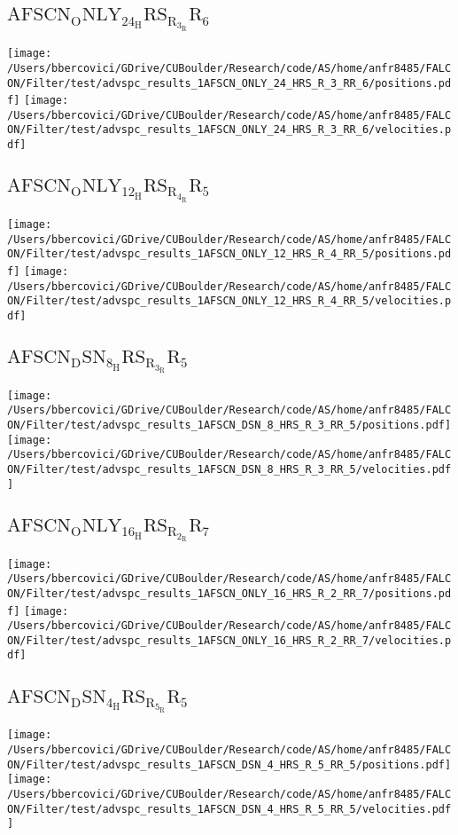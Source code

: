 \subsection{$\mathrm{AFSCN_ONLY_24_HRS_R_3_RR_6}$}
\texttt{[image: /Users/bbercovici/GDrive/CUBoulder/Research/code/AS/home/anfr8485/FALCON/Filter/test/advspc\_results\_1AFSCN\_ONLY\_24\_HRS\_R\_3\_RR\_6/positions.pdf]}
\texttt{[image: /Users/bbercovici/GDrive/CUBoulder/Research/code/AS/home/anfr8485/FALCON/Filter/test/advspc\_results\_1AFSCN\_ONLY\_24\_HRS\_R\_3\_RR\_6/velocities.pdf]}
\subsection{$\mathrm{AFSCN_ONLY_12_HRS_R_4_RR_5}$}
\texttt{[image: /Users/bbercovici/GDrive/CUBoulder/Research/code/AS/home/anfr8485/FALCON/Filter/test/advspc\_results\_1AFSCN\_ONLY\_12\_HRS\_R\_4\_RR\_5/positions.pdf]}
\texttt{[image: /Users/bbercovici/GDrive/CUBoulder/Research/code/AS/home/anfr8485/FALCON/Filter/test/advspc\_results\_1AFSCN\_ONLY\_12\_HRS\_R\_4\_RR\_5/velocities.pdf]}
\subsection{$\mathrm{AFSCN_DSN_8_HRS_R_3_RR_5}$}
\texttt{[image: /Users/bbercovici/GDrive/CUBoulder/Research/code/AS/home/anfr8485/FALCON/Filter/test/advspc\_results\_1AFSCN\_DSN\_8\_HRS\_R\_3\_RR\_5/positions.pdf]}
\texttt{[image: /Users/bbercovici/GDrive/CUBoulder/Research/code/AS/home/anfr8485/FALCON/Filter/test/advspc\_results\_1AFSCN\_DSN\_8\_HRS\_R\_3\_RR\_5/velocities.pdf]}
\subsection{$\mathrm{AFSCN_ONLY_16_HRS_R_2_RR_7}$}
\texttt{[image: /Users/bbercovici/GDrive/CUBoulder/Research/code/AS/home/anfr8485/FALCON/Filter/test/advspc\_results\_1AFSCN\_ONLY\_16\_HRS\_R\_2\_RR\_7/positions.pdf]}
\texttt{[image: /Users/bbercovici/GDrive/CUBoulder/Research/code/AS/home/anfr8485/FALCON/Filter/test/advspc\_results\_1AFSCN\_ONLY\_16\_HRS\_R\_2\_RR\_7/velocities.pdf]}
\subsection{$\mathrm{AFSCN_DSN_4_HRS_R_5_RR_5}$}
\texttt{[image: /Users/bbercovici/GDrive/CUBoulder/Research/code/AS/home/anfr8485/FALCON/Filter/test/advspc\_results\_1AFSCN\_DSN\_4\_HRS\_R\_5\_RR\_5/positions.pdf]}
\texttt{[image: /Users/bbercovici/GDrive/CUBoulder/Research/code/AS/home/anfr8485/FALCON/Filter/test/advspc\_results\_1AFSCN\_DSN\_4\_HRS\_R\_5\_RR\_5/velocities.pdf]}
